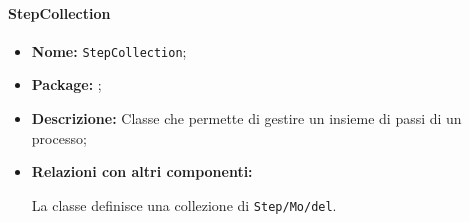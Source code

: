 \paragraph{StepCollection}
\begin{flushleft}
\begin{itemize}
\item \textbf{Nome:} \texttt{StepCollection};
\item \textbf{Package:} \texttt{\collection{}};
\item \textbf{Descrizione:} Classe che permette di gestire un insieme di passi di un processo;
\item \textbf{Relazioni con altri componenti:}
\begin{sloppypar}
La classe definisce una collezione di \texttt{\collection{}Step\fshyp{}Mo\fshyp{}del}.
\end{sloppypar}
\end{itemize}
\end{flushleft}